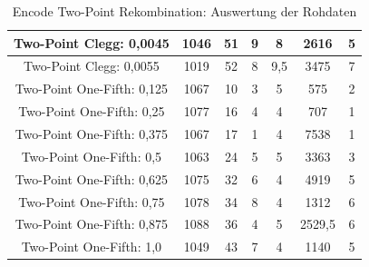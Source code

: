 \begin{table}[H]
\begin{tabular}{c | c | c | c | c | c | c}
		\hline
		Two-Point Clegg: 0,0045 & 1046 & 51 & 9 & 8 & 2616 & 5\\
		\hline
		Two-Point Clegg: 0,0055 & 1019 & 52 & 8 & 9,5 & 3475 & 7\\
		\hline
		Two-Point One-Fifth: 0,125 & 1067 & 10 & 3 & 5 & 575 & 2\\
		\hline
		Two-Point One-Fifth: 0,25 & 1077 & 16 & 4 & 4 & 707 & 1\\
		\hline
		Two-Point One-Fifth: 0,375 & 1067 & 17 & 1 & 4 & 7538 & 1\\
		\hline
		Two-Point One-Fifth: 0,5 & 1063 & 24 & 5 & 5 & 3363 & 3\\
		\hline
		Two-Point One-Fifth: 0,625 & 1075 & 32 & 6 & 4 & 4919 & 5\\
		\hline
		Two-Point One-Fifth: 0,75 & 1078 & 34 & 8 & 4 & 1312 & 6\\
		\hline
		Two-Point One-Fifth: 0,875 & 1088 & 36 & 4 & 5 & 2529,5 & 6\\
		\hline
		Two-Point One-Fifth: 1,0 & 1049 & 43 & 7 & 4 & 1140 & 5\\
	\end{tabular}
	\caption{Encode Two-Point Rekombination: Auswertung der Rohdaten}
	\label{table:encodeTwoPointRohdaten}
\end{table}

